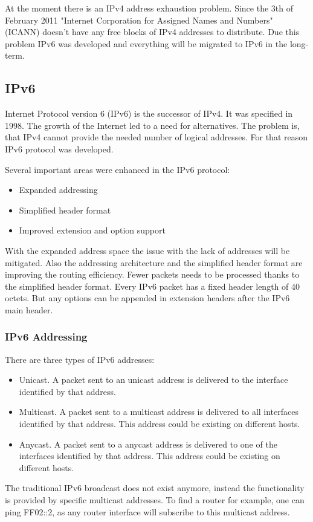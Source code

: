 \documentclass[a4paper]{report}
\begin{document}
At the moment there is an IPv4 address exhaustion problem. Since the 3th of February 2011 "Internet Corporation for Assigned Names and Numbers" (ICANN) doesn't have any free blocks of IPv4 addresses to distribute. Due this problem IPv6 was developed and everything will be migrated to IPv6 in the long-term. 
\subsection{IPv6}
\label{ssec:IPv6}
Internet Protocol version 6 (IPv6) is the successor of IPv4. It was specified in 1998. The growth of the Internet led to a need for alternatives. The problem is, that IPv4 cannot provide the needed number of logical addresses. For that reason IPv6 protocol was developed.\parencite[11]{Babatunde2014}

Several important areas were enhanced in the IPv6 protocol:
\begin{itemize}
	\item Expanded addressing
	\item Simplified header format
	\item Improved extension and option support
\end{itemize}
With the expanded address space the issue with the lack of addresses will be mitigated. Also the addressing architecture and the simplified header format are improving the routing efficiency. Fewer packets needs to be processed thanks to the simplified header format. 
Every IPv6 packet has a fixed header length of 40 octets. But any options can be appended in extension headers after the IPv6 main header. \parencite[106-107,123-124]{Loshin2004}

\subsubsection{IPv6 Addressing}
\label{sssec:ipv6:addressing}
There are three types of IPv6 addresses:
\begin{itemize}
	\item Unicast. A packet sent to an unicast address is delivered to the interface identified by that address.
	\item Multicast. A packet sent to a multicast address is delivered to all interfaces identified by that address. This address could be existing on different hosts.
	\item Anycast. A packet sent to a anycast address is delivered to one of the interfaces identified by that address. This address could be existing on different hosts.
\end{itemize}
The traditional IPv6 broadcast does not exist anymore, instead the functionality is provided by specific multicast addresses. To find a router for example, one can ping FF02::2, as any router interface will subscribe to this multicast address. \parencite[142-143]{Loshin2004}
\end{document}
